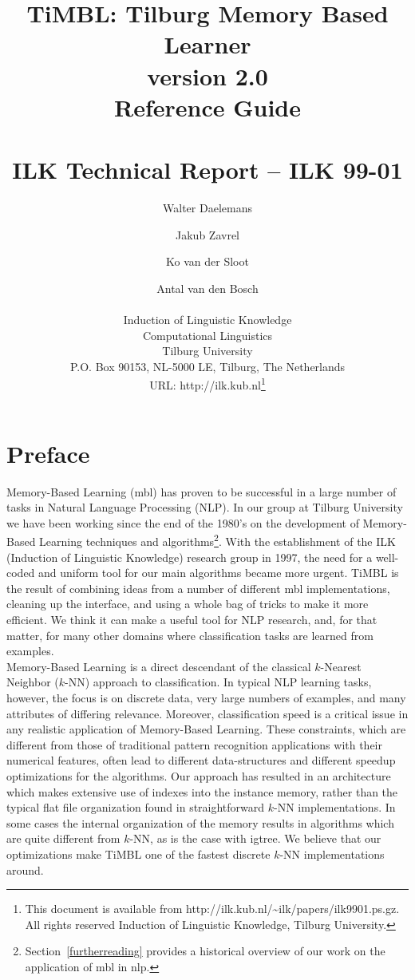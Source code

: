 \documentclass{report}
\author{Walter Daelemans \and Jakub Zavrel\and Ko van der Sloot \and
	Antal van den Bosch\\ \ \\
	Induction of Linguistic Knowledge\\
	Computational Linguistics\\ 
        Tilburg University \\ 
        P.O. Box 90153, NL-5000 LE, Tilburg, The Netherlands \\ 
        URL: http://ilk.kub.nl\thanks{This document is available from
	http://ilk.kub.nl/\~{}ilk/papers/ilk9901.ps.gz. All rights reserved
	Induction of Linguistic Knowledge, Tilburg University.}}
\title{{\huge TiMBL: Tilburg Memory Based Learner}\\version
2.0\\{\huge Reference Guide}\\ \ \\ILK Technical Report -- ILK 99-01}
\begin{document}

\maketitle

\tableofcontents

\chapter*{Preface}

Memory-Based Learning ({\sc mbl}) has proven to be successful in
a large number of tasks in Natural Language Processing (NLP). In our
group at Tilburg University we have been working since the end of the
1980's on the development of Memory-Based Learning techniques and
algorithms\footnote{Section~\ref{furtherreading} provides a historical
overview of our work on the application of {\sc mbl} in {\sc
nlp}.}. With the establishment of the ILK (Induction of Linguistic
Knowledge) research group in 1997, the need for a well-coded and
uniform tool for our main algorithms became more urgent. TiMBL is the
result of combining ideas from a number of different {\sc mbl}
implementations, cleaning up the interface, and using a whole bag of
tricks to make it more efficient. We think it can make a useful tool
for NLP research, and, for that matter, for many other domains where
classification tasks are learned from examples.\\

Memory-Based Learning is a direct descendant of the classical
$k$-Nearest Neighbor ($k$-NN) approach to classification. In typical
NLP learning tasks, however, the focus is on discrete data, very large
numbers of examples, and many attributes of differing
relevance. Moreover, classification speed is a critical issue in any
realistic application of Memory-Based Learning. These constraints,
which are different from those of traditional pattern
recognition applications with their numerical features, often lead to
different data-structures and different speedup optimizations for the
algorithms. Our approach has resulted in an architecture which makes
extensive use of indexes into the instance memory, rather than the
typical flat file organization found in straightforward $k$-NN
implementations. In some cases the internal organization of the memory
results in algorithms which are quite different from $k$-NN, as is the
case with {\sc igtree}. We believe that our optimizations make TiMBL
one of the fastest discrete $k$-NN implementations around.\\
\end{document}
